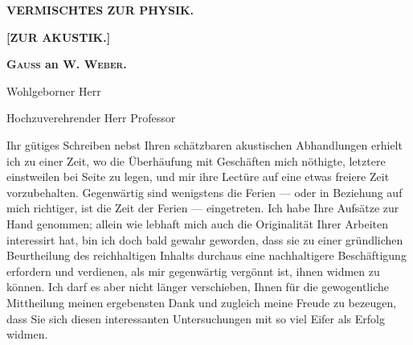 \clearpage\begingroup
{}\NoSourceHead
\begin{center}
\textbf{\Large VERMISCHTES ZUR PHYSIK.}\par\bigskip
\textbf{\large [ZUR AKUSTIK.]}\par\bigskip
\textbf{\large{}}\par\bigskip
\textbf{\textsc{Gauss} an \textsc{W. Weber}.}
\end{center}
\noindent\hspace*{2\parindent}Wohlgeborner Herr\par
\noindent\hspace*{2\parindent}Hochzuverehrender Herr Professor

Ihr gütiges Schreiben nebst Ihren schätzbaren akustischen Abhandlungen erhielt ich zu einer Zeit, wo die Überhäufung mit Geschäften mich nöthigte, letztere einstweilen bei Seite zu legen, und mir ihre Lectüre auf eine etwas freiere Zeit vorzubehalten. Gegenwärtig sind wenigstens die Ferien — oder in Beziehung auf mich richtiger, ist die Zeit der Ferien — eingetreten. Ich habe Ihre Aufsätze zur Hand genommen; allein wie lebhaft mich auch die Originalität Ihrer Arbeiten interessirt hat, bin ich doch bald gewahr geworden, dass sie zu einer gründlichen Beurtheilung des reichhaltigen Inhalts durchaus eine nachhaltigere Beschäftigung erfordern und verdienen, als mir gegenwärtig vergönnt ist, ihnen widmen zu können. Ich darf es aber nicht länger verschieben, Ihnen für die gewogentliche Mittheilung meinen ergebensten Dank und zugleich meine Freude zu bezeugen, dass Sie sich diesen interessanten Untersuchungen mit so viel Eifer als Erfolg widmen.

